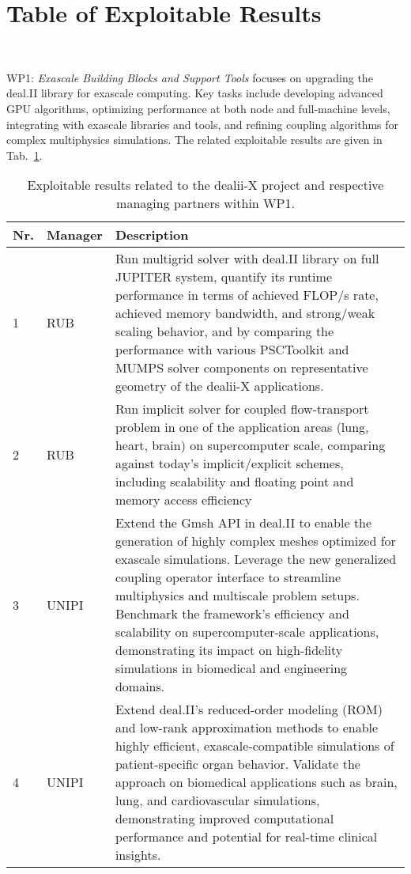 \documentclass[a4paper,12pt]{article}
\begin{document}
\newpage

\section{{Table of Exploitable Results}}~\label{sec:table_exploitable_results}

WP1: \textit{Exascale Building Blocks and Support Tools} focuses on upgrading the deal.II library for exascale computing. Key tasks include developing advanced GPU algorithms, optimizing performance at both node and full-machine levels, integrating with exascale libraries and tools, and refining coupling algorithms for complex multiphysics simulations. The related exploitable results are given in Tab.~\ref{tab:exploitable_results_WP1}.

\begin{center}
    \small
    \renewcommand{\arraystretch}{1.25}
    \begin{longtable}{|l|p{2.5cm}|p{12cm}|}
    \caption{Exploitable results related to the dealii-X project and respective managing partners within WP1.}
    \label{tab:exploitable_results_WP1}
    \\
    \hline
    \textbf{Nr.} & \textbf{Manager} & \textbf{Description} \\
    \hline
    1 & RUB &
    Run multigrid solver with deal.II library on full JUPITER system,
    quantify its runtime performance in terms of achieved FLOP/s rate, 
    achieved memory bandwidth, and strong/weak scaling behavior, and
    by comparing the performance with various PSCToolkit and MUMPS
    solver components on representative geometry of the dealii-X applications.
    \\
    \hline
    2 & RUB &
    Run implicit solver for coupled flow-transport problem in one of the application areas (lung, heart, brain) on supercomputer scale, comparing against today's implicit/explicit schemes, including scalability and floating point and memory access efficiency 
    \\
    \hline
    3 & UNIPI &
    Extend the Gmsh API in deal.II to enable the generation of highly complex meshes optimized for exascale simulations. Leverage the new generalized coupling operator interface to streamline multiphysics and multiscale problem setups. Benchmark the framework’s efficiency and scalability on supercomputer-scale applications, demonstrating its impact on high-fidelity simulations in biomedical and engineering domains.
    \\
    \hline
    4 & UNIPI &
    Extend deal.II’s reduced-order modeling (ROM) and low-rank approximation methods to enable highly efficient, exascale-compatible simulations of patient-specific organ behavior. Validate the approach on biomedical applications such as brain, lung, and cardiovascular simulations, demonstrating improved computational performance and potential for real-time clinical insights. 

\end{longtable}
\end{center}
\end{document}
